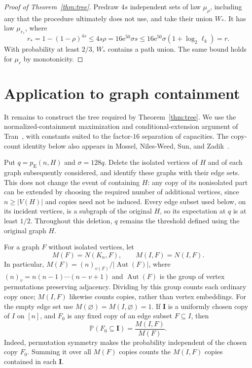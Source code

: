 \documentclass[11pt]{article}
\numberwithin{equation}{section}
\newcommand{\PP}{\mathbb P}
\newcommand{\pE}{p_{\mathrm E}}
\newcommand{\ee}{\mathrm e}
\begin{document}
\begin{proof}[Proof of Theorem~\ref{thm:tree}]
Predraw $4s$ independent sets of law $\mu_\rho$, including any that
the procedure ultimately does not use, and take their union $W_* $.
It has law $\mu_{r_*}$, where
\[
 r_*=1-(1-\rho)^{4s}
 \le4s\rho
 =16\ee^{50}\sigma s
 \le16\ee^{50}\sigma(1+\log_2\ell_k)=r.
\]
With probability at least $2/3$, $W_*$ contains a path union.
The same bound holds for $\mu_r$ by monotonicity.
\end{proof}


\section{Application to graph containment}\label{sec:graphs}

It remains to construct the tree required by Theorem~\ref{thm:tree}.
We use the normalized-containment maximization and conditional-extension
argument of Tran~\cite[Section~3, Lemma~3.1]{Tran26}, with constants suited
to the factor-$16$ separation of capacities. The copy-count identity below
also appears in Mossel, Niles-Weed, Sun, and Zadik~\cite[Equation~(5)]{MNSZ22}.

Put $q=\pE(n,H)$ and $\sigma=128q$. Delete the isolated vertices of $H$
and of each graph subsequently considered, and identify these graphs
with their edge sets. This does not change the event of containing
$H$: any copy of its nonisolated part can be extended by choosing the
required number of additional vertices, since $n\ge|V(H)|$ and
copies need not be induced. Every edge subset used below, on its
incident vertices, is a subgraph of the original $H$, so its
expectation at $q$ is at least $1/2$.
Throughout this deletion, $q$ remains the threshold defined using the
original graph $H$.

For a graph $F$ without isolated vertices, let
\[
 M(F)=N(K_n,F),\qquad M(I,F)=N(I,F).
\]
In particular, $M(F)=(n)_{v(F)}/|\operatorname{Aut}(F)|$, where
$(n)_v=n(n-1)\cdots(n-v+1)$ and $\operatorname{Aut}(F)$ is the group of
vertex permutations preserving adjacency. Dividing by this group counts
each ordinary copy once; $M(I,F)$ likewise counts copies, rather than
vertex embeddings.
For the empty edge set use $M(\varnothing)=M(I,\varnothing)=1$.
If $\boldsymbol I$ is a uniformly chosen copy of $I$ on $[n]$, and
$F_0$ is any fixed copy of an edge subset $F\subseteq I$, then
\begin{equation}\label{eq:copy-ratio}
 \PP(F_0\subseteq\boldsymbol I)=\frac{M(I,F)}{M(F)}.
\end{equation}
Indeed, permutation symmetry makes the probability independent of
the chosen copy $F_0$. Summing it over all $M(F)$ copies counts the
$M(I,F)$ copies contained in each $\boldsymbol I$.
\end{document}
